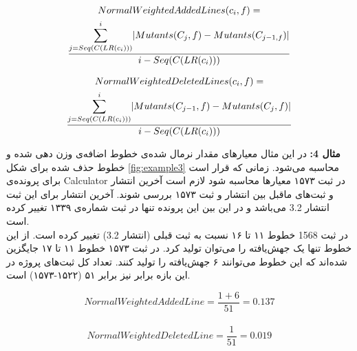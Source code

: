 \begin{latin}
\begin{multline*}
NormalWeightedAddedLines(c_i,f) =\\ \frac{ \mathlarger{\sum}\limits_{j=Seq(C(LR(c_i)))}^{i} |Mutants(C_j,f) - Mutants(C_{j-1,f})|
	}{i - Seq(C(LR(c_i)))}\\
\end{multline*}
\end{latin}

\begin{latin}
	\begin{multline*}
	NormalWeightedDeletedLines(c_i,f) =\\ \frac{ \mathlarger{\sum}\limits_{j=Seq(C(LR(c_i)))}^{i} |Mutants(C_{j-1},f) - Mutants(C_j,f)|
	}{i - Seq(C(LR(c_i)))}\\
	\end{multline*}
\end{latin}

 
\textbf{مثال 4:}
در این مثال معیار‌های مقدار نرمال شده‌ی خطوط اضافه‌ی وزن دهی شده و خطوط حذف شده برای شکل \ref{fig:example3} محاسبه می‌شود. زمانی که قرار است برای پرونده‌ی Calculator  در ثبت ۱۵۷۳ معیارها محاسبه شود لازم است آخرین انتشار و ثبت‌های ماقبل بین انتشار و ثبت ۱۵۷۳ بررسی شوند. آخرین انتشار برای این ثبت انتشار  3.2 می‌باشد و  در این بین این پرونده تنها در ثبت شماره‌ی ۱۳۳۹ تغییر کرده است. \\
در ثبت 1568 خطوط ۱۱ تا ۱۶ نسبت به ثبت قبلی (انتشار 3.2) تغییر کرده است. از این خطوط تنها یک جهش‌یافته را می‌توان تولید کرد. در ثبت ۱۵۷۳ خطوط ۱۱ تا ۱۷ جایگزین شده‌اند که این خطوط می‌توانند ۶ جهش‌یافته را تولید کنند. تعداد کل ثبت‌های پروژه در این بازه  برابر نیز برابر ۵۱ 
(۱۵۲۲-۱۵۷۳) 
است. 
\begin{latin}
\[
NormalWeightedAddedLine = \frac{1+6}{51} = 0.137\]\\
\[
NormalWeightedDeletedLine = \frac{1}{51} = 0.019
\]
\end{latin}



